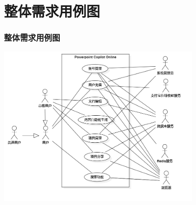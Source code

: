 \section{整体需求用例图}
\begin{frame}
    \frametitle{整体需求用例图}
    \center
    \includegraphics[width=4in]{contents/figure/overal_usecase_diagram.png}

\end{frame}